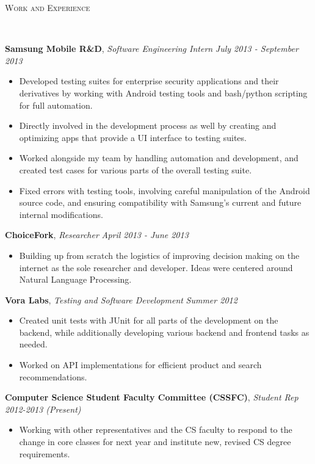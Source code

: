 \documentclass[9pt]{article}
\newenvironment{changemargin}[2]{%
  \begin{list}{}{%
    \setlength{\topsep}{0pt}%
    \setlength{\leftmargin}{#1}%
    \setlength{\rightmargin}{#2}%
    \setlength{\listparindent}{\parindent}%
    \setlength{\itemindent}{\parindent}%
    \setlength{\parsep}{\parskip}%
  }%
  \item[]}{\end{list}
}
\newcommand{\lineover}{
	\begin{changemargin}{-0.05in}{-0.05in}
		\vspace*{-8pt}
		\hrulefill \\
		\vspace*{-2pt}
	\end{changemargin}
}
\newcommand{\header}[1]{
	\begin{changemargin}{-0.5in}{-0.5in}
		\scshape{#1}\\
  	\lineover
	\end{changemargin}
}
\newenvironment{body} {
	\vspace*{-16pt}
	\begin{changemargin}{-0.25in}{-0.5in}
  }	
	{\end{changemargin}
}
\begin{document}
\header{Work and Experience}
\smallskip
\begin{body}
	\vspace{14pt}
	\textbf{Samsung Mobile R\&D}, \emph{Software Engineering Intern} \hfill \emph{July 2013 - September 2013}\\
	\vspace*{-4pt}
	\begin{itemize} \itemsep -0pt %
	\item Developed testing suites for enterprise security applications and their derivatives by working with Android testing tools and bash/python scripting for full automation.
	\item Directly involved in the development process as well by creating and optimizing apps that provide a UI interface to testing suites.
	\item Worked alongside my team by handling automation and development, and created test cases for various parts of the overall testing suite.
	\item Fixed errors with testing tools, involving careful manipulation of the Android source code, and ensuring compatibility with Samsung's current and future internal modifications.
	\end{itemize}
	\textbf{ChoiceFork}, \emph{Researcher} \hfill \emph{April 2013 - June 2013}\\
	\vspace*{-4pt}
	\begin{itemize} \itemsep -0pt  %
		\item Building up from scratch the logistics of improving decision making on the internet as the sole researcher and developer. Ideas were centered around Natural Language Processing.
	\end{itemize}
\smallskip
	\textbf{Vora Labs}, \emph{Testing and Software Development} \hfill \emph{Summer 2012}\\
	\vspace*{-4pt}
	\begin{itemize} \itemsep -0pt  %
		\item Created unit tests with JUnit for all parts of the development on the backend, while additionally developing various backend and frontend tasks as needed.
		\item Worked on API implementations for efficient product and search recommendations.
	\end{itemize}
\smallskip
	\textbf {Computer Science Student Faculty Committee (CSSFC)}, \emph{Student Rep} \hfill \emph{2012-2013 (Present)}\\
	\vspace*{-4pt}
	\begin{itemize} \itemsep -0pt
		\item Working with other representatives and the CS faculty to respond to the change in core classes for next year and institute new, revised CS degree requirements.
	\end{itemize}

	
\end{body}
\end{document}
